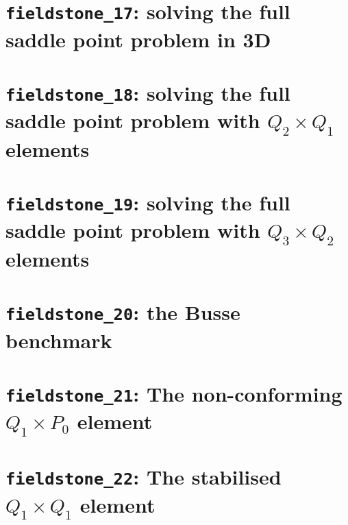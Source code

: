 \documentclass[a4paper]{article}
\begin{document}
\newpage
\section{{\tt fieldstone\_17}: solving the full saddle point problem in 3D \label{f17}}


\newpage
\section{{\tt fieldstone\_18}: solving the full saddle point problem with $Q_2\times Q_1$ elements \label{f18}}


\newpage
\section{{\tt fieldstone\_19}: solving the full saddle point problem with $Q_3\times Q_2$ elements \label{f19}}


\newpage
\section{{\tt fieldstone\_20}: the Busse benchmark \label{f20}}


\newpage
\section{{\tt fieldstone\_21}: The non-conforming $Q_1 \times P_0$ element \label{f21}}


\newpage
\section{{\tt fieldstone\_22}: The stabilised $Q_1 \times Q_1$ element \label{f22}} 


\newpage
\end{document}
